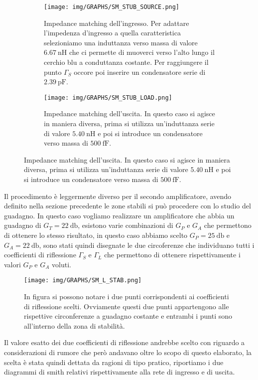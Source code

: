 \documentclass[12pt,oneside]{book}
\begin{document}
\begin{figure}[!htbp]
    \centering
    \begin{subfigure}[t]{0.48\textwidth}
        \centering
        \texttt{[image: img/GRAPHS/SM\_STUB\_SOURCE.png]}
        \caption{Impedance matching dell'ingresso. Per adattare l'impedenza d'ingresso a quella caratteristica selezioniamo una induttanza verso massa di valore $\SI{6.67}{\nano\henry}$ che ci permette di muoverci verso l'alto lungo il cerchio blu a conduttanza costante. Per raggiungere il punto $\Gamma_{S}$ occore poi inserire un condensatore serie di $\SI{2.39}{\pico\farad}$.}
    \end{subfigure}
    \hfill
    \begin{subfigure}[t]{0.48\textwidth}
        \centering
        \texttt{[image: img/GRAPHS/SM\_STUB\_LOAD.png]}
        \caption{Impedance matching dell'uscita. In questo caso si agisce in maniera diversa, prima si utilizza un'induttanza serie di valore $\SI{5.40}{\nano\henry}$ e poi si introduce un condensatore verso massa di $\SI{500}{\femto\farad}$.}
    \end{subfigure}
    \hfill
\end{figure}

Il procedimento è leggermente diverso per il secondo amplificatore, avendo definito nella sezione precedente le zone stabili si può procedere con lo studio del guadagno.
In questo caso vogliamo realizzare un amplificatore che abbia un guadagno di $G_T=\SI{22}{\decibel}$, esistono varie combinazioni di $G_P$ e $G_A$ che permettono di ottenere lo stesso risultato, in questo caso abbiamo scelto $G_P=\SI{25}{\decibel}$ e $G_A=\SI{22}{\decibel}$, sono stati quindi disegnate le due circoferenze che individuano tutti i coefficienti di riflessione $\Gamma_{S}$ e $\Gamma_{L}$ che permettono di ottenere rispettivamente i valori $G_P$ e $G_A$ voluti.

\begin{figure}[!htbp]
    \centering
        \texttt{[image: img/GRAPHS/SM\_L\_STAB.png]}
        \caption{In figura si possono notare i due punti corrispondenti ai coefficienti di riflessione scelti. Ovviamente questi due punti appartengono alle rispettive circonferenze a guadagno costante e entrambi i punti sono all'interno della zona di stabilità.}
\end{figure}

Il valore esatto dei due coefficienti di riflessione andrebbe scelto con riguardo a considerazioni di rumore che però andavano oltre lo scopo di questo elaborato, la scelta è stata quindi dettata da ragioni di tipo pratico, riportiamo i due diagrammi di smith relativi rispettivamente alla rete di ingresso e di uscita.
\end{document}
